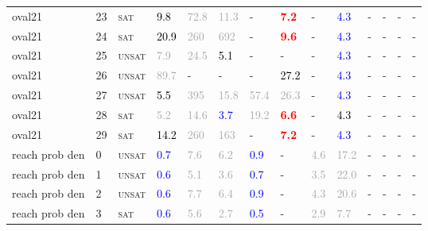 \begin{center}
{\begin{longtable}{@{}llllllllllllll@{}}
oval21 & 23 & \textsc{sat} & \textcolor{black}{9.8} & \textcolor{darkgray}{72.8} & \textcolor{darkgray}{11.3} & - & \textbf{\textcolor{red}{7.2}} & - & \textcolor{blue}{4.3} & - & - & - & - \\
oval21 & 24 & \textsc{sat} & \textcolor{black}{20.9} & \textcolor{darkgray}{260} & \textcolor{darkgray}{692} & - & \textbf{\textcolor{red}{9.6}} & - & \textcolor{blue}{4.3} & - & - & - & - \\
oval21 & 25 & \textsc{unsat} & \textcolor{darkgray}{7.9} & \textcolor{darkgray}{24.5} & \textcolor{black}{5.1} & - & - & - & \textcolor{blue}{4.3} & - & - & - & - \\
oval21 & 26 & \textsc{unsat} & \textcolor{darkgray}{89.7} & - & - & - & \textcolor{black}{27.2} & - & \textcolor{blue}{4.3} & - & - & - & - \\
oval21 & 27 & \textsc{unsat} & \textcolor{black}{5.5} & \textcolor{darkgray}{395} & \textcolor{darkgray}{15.8} & \textcolor{darkgray}{57.4} & \textcolor{darkgray}{26.3} & - & \textcolor{blue}{4.3} & - & - & - & - \\
oval21 & 28 & \textsc{sat} & \textcolor{darkgray}{5.2} & \textcolor{darkgray}{14.6} & \textcolor{blue}{3.7} & \textcolor{darkgray}{19.2} & \textbf{\textcolor{red}{6.6}} & - & \textcolor{black}{4.3} & - & - & - & - \\
oval21 & 29 & \textsc{sat} & \textcolor{black}{14.2} & \textcolor{darkgray}{260} & \textcolor{darkgray}{163} & - & \textbf{\textcolor{red}{7.2}} & - & \textcolor{blue}{4.3} & - & - & - & - \\
reach prob den & 0 & \textsc{unsat} & \textcolor{blue}{0.7} & \textcolor{darkgray}{7.6} & \textcolor{darkgray}{6.2} & \textcolor{blue}{0.9} & - & \textcolor{darkgray}{4.6} & \textcolor{darkgray}{17.2} & - & - & - & - \\
reach prob den & 1 & \textsc{unsat} & \textcolor{blue}{0.6} & \textcolor{darkgray}{5.1} & \textcolor{darkgray}{3.6} & \textcolor{blue}{0.7} & - & \textcolor{darkgray}{3.5} & \textcolor{darkgray}{22.0} & - & - & - & - \\
reach prob den & 2 & \textsc{unsat} & \textcolor{blue}{0.6} & \textcolor{darkgray}{7.7} & \textcolor{darkgray}{6.4} & \textcolor{blue}{0.9} & - & \textcolor{darkgray}{4.3} & \textcolor{darkgray}{20.6} & - & - & - & - \\
reach prob den & 3 & \textsc{sat} & \textcolor{blue}{0.6} & \textcolor{darkgray}{5.6} & \textcolor{darkgray}{2.7} & \textcolor{blue}{0.5} & - & \textcolor{darkgray}{2.9} & \textcolor{darkgray}{7.7} & - & - & - & - \\

\end{longtable}}
\end{center}
